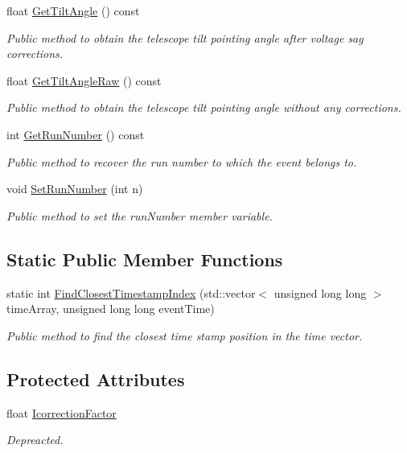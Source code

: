\begin{DoxyCompactItemize}
float \hyperlink{classIEvent_aaac27f1be83fb9af936d26847478a44e}{Get\+Tilt\+Angle} () const
\begin{DoxyCompactList}\small\item\em Public method to obtain the telescope tilt pointing angle after voltage sag corrections. \end{DoxyCompactList}\item 
float \hyperlink{classIEvent_a460b04b92872b5b4ff27441fae769476}{Get\+Tilt\+Angle\+Raw} () const
\begin{DoxyCompactList}\small\item\em Public method to obtain the telescope tilt pointing angle without any corrections. \end{DoxyCompactList}\item 
int \hyperlink{classIEvent_a2828467dd503a15bdfb83b4ce8452aa6}{Get\+Run\+Number} () const
\begin{DoxyCompactList}\small\item\em Public method to recover the run number to which the event belongs to. \end{DoxyCompactList}\item 
void \hyperlink{classIEvent_ac6366e40d60fe3ea754f4a019a2fed70}{Set\+Run\+Number} (int n)
\begin{DoxyCompactList}\small\item\em Public method to set the run\+Number member variable. \end{DoxyCompactList}\end{DoxyCompactItemize}
\subsection*{Static Public Member Functions}
\begin{DoxyCompactItemize}
\item 
static int \hyperlink{classIEvent_a07a5131ed389666370575f89b182816a}{Find\+Closest\+Timestamp\+Index} (std\+::vector$<$ unsigned long long $>$ time\+Array, unsigned long long event\+Time)
\begin{DoxyCompactList}\small\item\em Public method to find the closest time stamp position in the time vector. \end{DoxyCompactList}\end{DoxyCompactItemize}
\subsection*{Protected Attributes}
\begin{DoxyCompactItemize}
\item 
\mbox{\label{classIEvent_a7b06827fcf1c983a513ecedde056bbba}} 
float \hyperlink{classIEvent_a7b06827fcf1c983a513ecedde056bbba}{Icorrection\+Factor}
\begin{DoxyCompactList}\small\item\em Depreacted. \end{DoxyCompactList}\end{DoxyCompactItemize}

